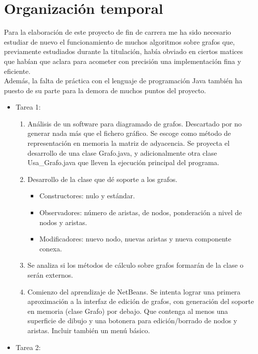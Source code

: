 \chapter{Organización temporal}
\label{chap:org.temporal}

Para la elaboración de este proyecto de fin de carrera me ha sido necesario estudiar de nuevo el funcionamiento de muchos algoritmos sobre grafos que, previamente estudiados durante la titulación, había obviado en ciertos matices que habían que aclara para acometer con precisión una implementación fina y eficiente.\\ Además, la falta de práctica con el lenguaje de programación Java también ha puesto de su parte para la demora de muchos puntos del proyecto.\\

\begin{itemize}
\item Tarea 1:

  \begin{enumerate}
  \item Análisis de un software para diagramado de grafos. Descartado por no generar nada más que el fichero gráfico. Se escoge como método de representación en memoria la matriz de adyacencia. Se proyecta el desarrollo de una clase Grafo.java, y adicionalmente otra clase Usa\_Grafo.java que lleven la ejecución principal del programa.
  \item Desarrollo de la clase que dé soporte a los grafos.
    \begin{itemize}
    \item Constructores: nulo y estándar.
    \item Observadores: número de aristas, de nodos, ponderación a nivel de nodos y aristas.
    \item Modificadores: nuevo nodo, nuevas aristas y nueva componente conexa.
    \end{itemize}
  \item Se analiza si los métodos de cálculo sobre grafos formarán de la clase o serán externos.
  \item Comienzo del aprendizaje de NetBeans. Se intenta lograr una primera aproximación a la interfaz de edición de grafos, con generación del soporte en memoria (clase Grafo) por debajo. Que contenga al menos una superficie de dibujo y una botonera para edición/borrado de nodos y aristas. Incluir también un menú básico.
  \end{enumerate}

\item Tarea 2:


\end{itemize}

